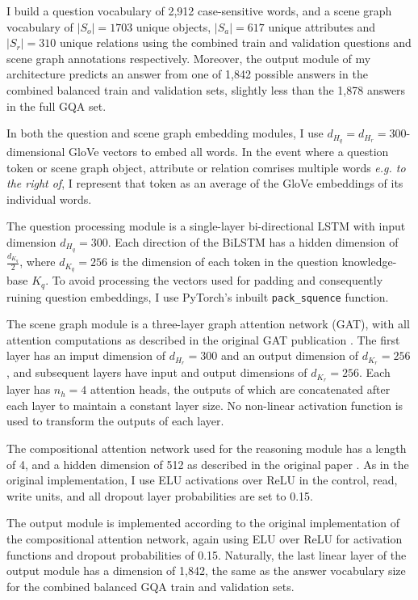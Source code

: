 I build a question vocabulary of 2,912 case-sensitive words, and a scene graph vocabulary of \(|S_o| = 1703\) unique objects, \(|S_a| = 617\) unique attributes and \(|S_r| = 310\) unique relations using the combined train and validation questions and scene graph annotations respectively. Moreover, the output module of my architecture predicts an answer from one of 1,842 possible answers in the combined balanced train and validation sets, slightly less than the 1,878 answers in the full GQA set.

In both the question and scene graph embedding modules, I use \(d_{H_q} = d_{H_r} = 300\)-dimensional GloVe vectors \cite{pennington2014glove} to embed all words. In the event where a question token or scene graph object, attribute or relation comrises multiple words \textit{e.g. to the right of}, I represent that token as an average of the GloVe embeddings of its individual words.

The question processing module is a single-layer bi-directional LSTM \cite{hochreiter1997long} with input dimension \(d_{H_q} = 300\). Each direction of the BiLSTM has a hidden dimension of \(\frac{d_{K_q}}{2}\), where \(d_{K_q} = 256\) is the dimension of each token in the question knowledge-base \(K_q\). To avoid processing the vectors used for padding and consequently ruining question embeddings, I use PyTorch's inbuilt \texttt{pack\_squence} function. \cite{paszke2019pytorch}

The scene graph module is a three-layer graph attention network (GAT), with all attention computations as described in the original GAT publication \cite{velivckovic2017graph}. The first layer has an imput dimension of \(d_{H_r} = 300\) and an output dimension of \(d_{K_r} = 256\), and subsequent layers have input and output dimensions of \(d_{K_r} = 256\). Each layer has \(n_h = 4\) attention heads, the outputs of which are concatenated after each layer to maintain a constant layer size. No non-linear activation function is used to transform the outputs of each layer.

The compositional attention network used for the reasoning module has a length of 4, and a hidden dimension of 512 as described in the original paper \cite{hudson2018compositional}. As in the original implementation, I use ELU activations over ReLU in the control, read, write units, and all dropout layer probabilities are set to 0.15.

The output module is implemented according to the original implementation of the compositional attention network, again using ELU over ReLU for activation functions and dropout probabilities of 0.15. Naturally, the last linear layer of the output module has a dimension of 1,842, the same as the answer vocabulary size for the combined balanced GQA train and validation sets.

